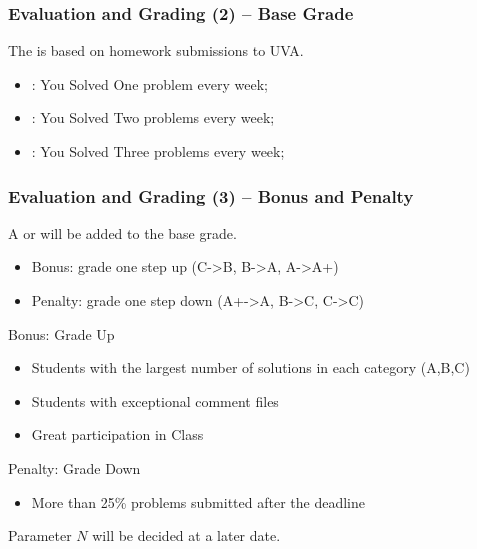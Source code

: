\documentclass{beamer}
\begin{document}
\begin{frame}
  \frametitle{Evaluation and Grading (2) -- Base Grade}

  The  is based on homework submissions to UVA.

  \bigskip
  
  \begin{itemize}
  \item {}: You Solved One problem every week;

    \medskip

  \item {}: You Solved Two problems every week;

    \medskip

  \item {}: You Solved Three problems every week;
  \end{itemize}

\end{frame}

\begin{frame}
  \frametitle{Evaluation and Grading (3) -- Bonus and Penalty}
  
  {\small
  A  or  will be added to the base grade.
  \begin{itemize}
    \item Bonus: grade one step up (C->B, B->A, A->A+)
    \item Penalty: grade one step down (A+->A, B->C, \alert{C->C})
  \end{itemize}
  }

  \medskip
  \begin{exampleblock}{Bonus: Grade Up}
    \begin{itemize}
    \item Students with the largest number of solutions in each
        category (A,B,C)
    \item Students with exceptional comment files
    \item Great participation in Class
    \end{itemize}
  \end{exampleblock}
  \begin{alertblock}{Penalty: Grade Down}
    \begin{itemize}
    \item More than 25\% problems submitted after the deadline
    \end{itemize}
  \end{alertblock}

  \tiny{Parameter $N$ will be decided at a later date.}
\end{frame}
\end{document}
